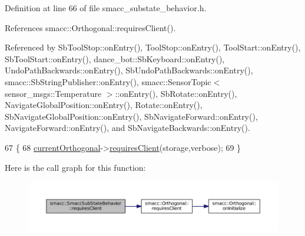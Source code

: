 Definition at line 66 of file smacc\+\_\+substate\+\_\+behavior.\+h.



References smacc\+::\+Orthogonal\+::requires\+Client().



Referenced by Sb\+Tool\+Stop\+::on\+Entry(), Tool\+Stop\+::on\+Entry(), Tool\+Start\+::on\+Entry(), Sb\+Tool\+Start\+::on\+Entry(), dance\+\_\+bot\+::\+Sb\+Keyboard\+::on\+Entry(), Undo\+Path\+Backwards\+::on\+Entry(), Sb\+Undo\+Path\+Backwards\+::on\+Entry(), smacc\+::\+Sb\+String\+Publisher\+::on\+Entry(), smacc\+::\+Sensor\+Topic$<$ sensor\+\_\+msgs\+::\+Temperature $>$\+::on\+Entry(), Sb\+Rotate\+::on\+Entry(), Navigate\+Global\+Position\+::on\+Entry(), Rotate\+::on\+Entry(), Sb\+Navigate\+Global\+Position\+::on\+Entry(), Sb\+Navigate\+Forward\+::on\+Entry(), Navigate\+Forward\+::on\+Entry(), and Sb\+Navigate\+Backwards\+::on\+Entry().


\begin{DoxyCode}
67     \{
68         \hyperlink{classsmacc_1_1SmaccSubStateBehavior_a40aac919bb306d95838fdfcc34cfe391}{currentOrthogonal}->\hyperlink{classsmacc_1_1Orthogonal_af6f6d9cc5bf5433f5fe3b640a6a0b8aa}{requiresClient}(storage,verbose);
69     \}
\end{DoxyCode}


Here is the call graph for this function\+:
\nopagebreak
\begin{figure}[H]
\begin{center}
\leavevmode
\includegraphics[width=350pt]{classsmacc_1_1SmaccSubStateBehavior_ae8361a9e794b02f9f3d962b881e4fd7d_cgraph}
\end{center}
\end{figure}




